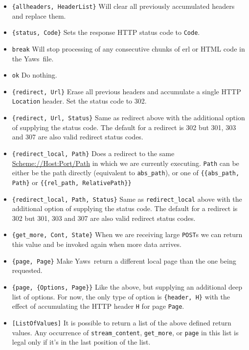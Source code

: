 \documentclass[11pt,oneside,english]{book}
\newcommand{\Yaws}            %
        {{\sc Yaws}}
\begin{document}
\begin{itemize}
\item \verb+{allheaders, HeaderList}+ Will clear all previously
  accumulated headers and replace them.

\item \verb+{status, Code}+ Sets the response HTTP status code to
  \verb+Code+.

\item \verb+break+ Will stop processing of any consecutive chunks of
  erl or HTML code in the \Yaws\ file.

\item \verb+ok+ Do nothing.

\item \verb+{redirect, Url}+ Erase all previous headers and accumulate
  a single HTTP \verb+Location+ header. Set the status code to 302.

\item \verb+{redirect, Url, Status}+ Same as redirect above with the
  additional option of supplying the status code. The default for a
  redirect is 302 but 301, 303 and 307 are also valid redirect status
  codes.

\item \verb+{redirect_local, Path}+ Does a redirect to the same
  \url{Scheme://Host:Port/Path} in which we are currently
  executing. \verb+Path+ can be either be the path directly
  (equivalent to \verb+abs_path+), or one of \verb+{{abs_path, Path}+
  or \verb+{{rel_path, RelativePath}}+

\item \verb+{redirect_local, Path, Status}+ Same as
  \verb+redirect_local+ above with the additional option of supplying
  the status code. The default for a redirect is 302 but 301, 303 and
  307 are also valid redirect status codes.

\item \verb+{get_more, Cont, State}+ When we are receiving large
  \verb+POST+s we can return this value and be invoked again when more
  data arrives.

\item \verb+{page, Page}+ Make \Yaws\ return a different local page
  than the one being requested.

\item \verb+{page, {Options, Page}}+ Like the above, but supplying an
  additional deep list of options.  For now, the only type of option
  is \verb+{header, H}+ with the effect of accumulating the HTTP
  header \verb+H+ for page \verb+Page+.

\item \verb+[ListOfValues]+ It is possible to return a list of the
  above defined return values.  Any occurrence of
  \verb+stream_content+, \verb+get_more+, or \verb+page+ in this list
  is legal only if it's in the last position of the list.

\end{itemize}
\end{document}
